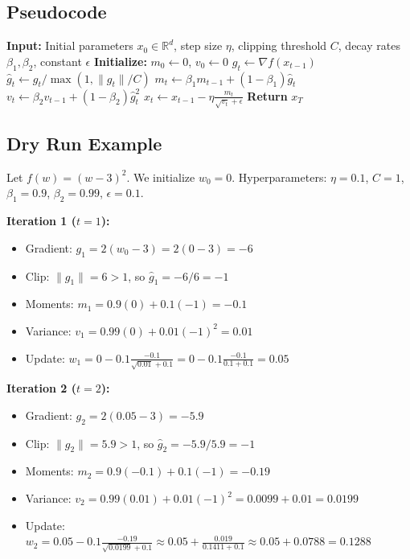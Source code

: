 \documentclass{article}
\begin{document}
\subsection*{Pseudocode}
\begin{algorithm}[H]
\caption{Clipped Adam}
\begin{algorithmic}[1]
\State \textbf{Input:} Initial parameters $x_0 \in \mathbb{R}^d$, step size $\eta$, clipping threshold $C$, decay rates $\beta_1, \beta_2$, constant $\epsilon$
\State \textbf{Initialize:} $m_0 \gets 0$, $v_0 \gets 0$
    \State $g_t \gets \nabla f(x_{t-1})$
    \State $\hat{g}_t \gets g_t / \max(1, \|g_t\|/C)$
    \State $m_t \gets \beta_1 m_{t-1} + (1 - \beta_1) \hat{g}_t$
    \State $v_t \gets \beta_2 v_{t-1} + (1 - \beta_2) \hat{g}_t^2$
    \State $x_t \gets x_{t-1} - \eta \frac{m_t}{\sqrt{v_t} + \epsilon}$
\EndFor
\State \textbf{Return} $x_T$
\end{algorithmic}
\end{algorithm}

\subsection*{Dry Run Example}
Let $f(w) = (w-3)^2$. We initialize $w_0 = 0$. 
Hyperparameters: $\eta = 0.1$, $C = 1$, $\beta_1 = 0.9$, $\beta_2 = 0.99$, $\epsilon = 0.1$.

\textbf{Iteration 1 ($t=1$):}
\begin{itemize}
    \item Gradient: $g_1 = 2(w_0 - 3) = 2(0 - 3) = -6$
    \item Clip: $\|g_1\| = 6 > 1$, so $\hat{g}_1 = -6 / 6 = -1$
    \item Moments: $m_1 = 0.9(0) + 0.1(-1) = -0.1$
    \item Variance: $v_1 = 0.99(0) + 0.01(-1)^2 = 0.01$
    \item Update: $w_1 = 0 - 0.1 \frac{-0.1}{\sqrt{0.01} + 0.1} = 0 - 0.1 \frac{-0.1}{0.1 + 0.1} = 0.05$
\end{itemize}

\textbf{Iteration 2 ($t=2$):}
\begin{itemize}
    \item Gradient: $g_2 = 2(0.05 - 3) = -5.9$
    \item Clip: $\|g_2\| = 5.9 > 1$, so $\hat{g}_2 = -5.9 / 5.9 = -1$
    \item Moments: $m_2 = 0.9(-0.1) + 0.1(-1) = -0.19$
    \item Variance: $v_2 = 0.99(0.01) + 0.01(-1)^2 = 0.0099 + 0.01 = 0.0199$
    \item Update: $w_2 = 0.05 - 0.1 \frac{-0.19}{\sqrt{0.0199} + 0.1} \approx 0.05 + \frac{0.019}{0.1411 + 0.1} \approx 0.05 + 0.0788 = 0.1288$
\end{itemize}
\end{document}
